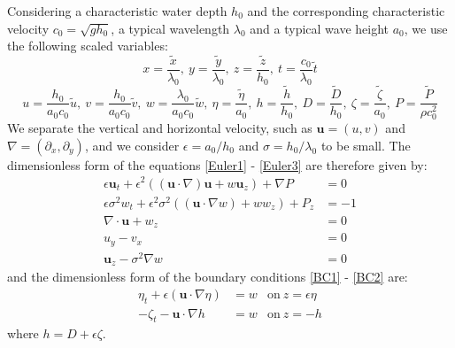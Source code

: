 \documentclass[11pt,a4paper]{article}
\begin{document}
	Considering a characteristic water depth $h_0$ and the corresponding 	characteristic velocity $c_0 = \sqrt{g h_0}$, a typical wavelength $\lambda_0$ and a typical wave height $a_0$, we use the following scaled variables: 
	\begin{equation*}
		x = \frac{\tilde{x}}{\lambda_0},\: 
		y = \frac{\tilde{y}}{\lambda_0}, \:
		z = \frac{\tilde{z}}{h_0}, \: 
		t = \frac{c_0}{\lambda_0}\tilde{t}
	\end{equation*}
	\begin{equation*}
		u = \frac{h_0}{a_0 c_0} \tilde{u},\:
		v = \dfrac{h_0}{a_0 c_0} \tilde{v},\:
		w = \dfrac{\lambda_0}{a_0 c_0} \tilde{w},\: 
		\eta = \dfrac{\tilde{\eta}}{a_0},\: 
		h = \dfrac{\tilde{h}}{h_0},\:
		D = \dfrac{\tilde{D}}{h_0}, \:
		\zeta = \dfrac{\tilde{\zeta}}{a_0},\:
		P = \dfrac{\tilde{P}}{\rho c_0^2}				
	\end{equation*}
	We separate the vertical and horizontal velocity, such as $\mathbf{u} = (u,v)$ and $\nabla = (\partial_x,\partial_y)$, and we consider $\epsilon = a_0 / h_0$ and $\sigma = h_0 / \lambda_0$ to be small. The dimensionless form of the equations \eqref{Euler1} - \eqref{Euler3} are therefore given by: 
	\begin{align}
		\epsilon \mathbf{u}_t + \epsilon^2((\mathbf{u} \cdot \nabla) \mathbf{u} + w \mathbf{u}_z) + \nabla P & = 0 \label{MConsxy}\\
		\epsilon \sigma^2 w_t + \epsilon^2 \sigma^2 ((\mathbf{u} \cdot \nabla w) + w w_z) + P_z & = -1 \label{MConsz}\\
		\nabla \cdot \mathbf{u} + w_z & =  0 \label{MassCons}\\
		u_y-v_x & = 0 \label{Irrxy}\\
		\mathbf{u}_z - \sigma^2 \nabla w & = 0 \label{Irrz}
	\end{align}
	and the dimensionless form of the boundary conditions \eqref{BC1} - \eqref{BC2} are: 
	\begin{align}
		\eta_t + \epsilon (\mathbf{u} \cdot \nabla \eta ) & = w & \mathrm{on} \: z =\epsilon \eta \label{BCH}\\
		- \zeta_t - \mathbf{u} \cdot \nabla h & = w & \mathrm{on} \:  z = -h
		\label{BCB}
	\end{align}
	where $h = D + \epsilon \zeta $.
			
\end{document}
